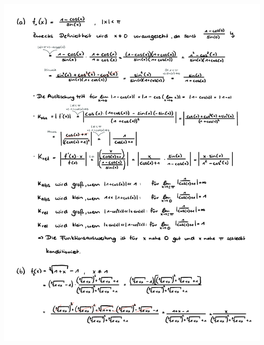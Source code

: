 \documentclass[a4paper,oneside,11pt]{scrartcl}
\begin{document}
\begin{minipage}[t]{\textwidth}
\includegraphics[scale = 0.75, page=2]{AlMa_blatt03.pdf}
\end{minipage}
\pagebreak
\end{document}
